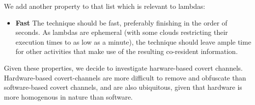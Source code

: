 \noindent We add another property to that list which is relevant to lambdas:
\begin{itemize}
    \item \textbf{Fast} The technique should be fast, preferably finishing in 
    the order of seconds. As lambdas are ephemeral (with some clouds restricting their 
    execution times to as low as a minute), the technique should leave ample time 
    for other activities that make use of the resulting co-resident information.
\end{itemize}


Given these properties, we decide to investigate harware-based covert channels.
Hardware-based covert-channels are more difficult to remove and obfuscate than
software-based covert channels, and are also ubiquitous, given that
hardware is more homogenous in nature than software. 



